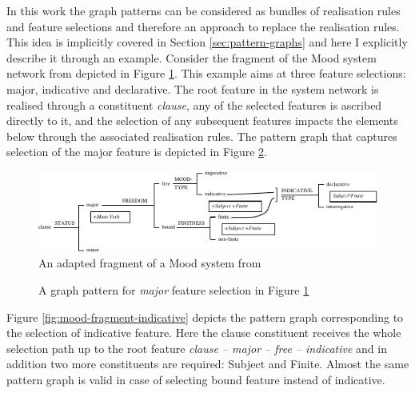 
    In this work the graph patterns can be considered as bundles of realisation rules and feature selections and therefore an approach to replace the realisation rules. This idea is implicitly covered in Section \ref{sec:pattern-graphs} and here I explicitly describe it through an example. Consider the fragment of the Mood system network from \citet[162]{Halliday2013} depicted in Figure \ref{fig:mood-fragment}. This example aims at three feature selections: major, indicative and declarative. The root feature in the system network is realised through a constituent \textit{clause}, any of the selected features is ascribed directly to it, and the selection of any subsequent features impacts the elements below through the associated realisation rules. The pattern graph that captures selection of the major feature is depicted in Figure \ref{fig:mood-fragment-major}. 

    \begin{figure}[!ht]
        \centering
        \includegraphics[width=\textwidth]{Figures/Example/mood-fragment.pdf}
        \caption{An adapted fragment of a Mood system from \citep[162]{Halliday2013} }
        \label{fig:mood-fragment}
    \end{figure}

    \begin{figure}[!ht]
        \centering
        \caption{A graph pattern for \textit{major} feature selection in Figure \ref{fig:mood-fragment}}
        \label{fig:mood-fragment-major}
    \end{figure}

    Figure \ref{fig:mood-fragment-indicative} depicts the pattern graph corresponding to the selection of indicative feature. Here the clause constituent receives the whole selection path up to the root feature \textit{clause -- major -- free -- indicative} and in addition two more constituents are required: Subject and Finite. Almost the same pattern graph is valid in case of selecting bound feature instead of indicative.

